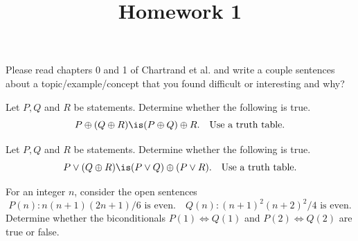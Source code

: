 \documentclass{homework}
\title{Homework 1}
\begin{document}
 \maketitle

\question Please read chapters 0 and 1 of Chartrand et al. and write a couple sentences about a topic/example/concept that you found difficult or interesting and why?

\question\label{a} Let $P, Q$ and $R$ be statements. Determine whether the following is true.
\[
    P \oplus (Q \oplus R) \is (P \oplus Q) \oplus R. \quad \text{Use a truth table.}
\]

\question Let $P, Q$ and $R$ be statements. Determine whether the following is true.
\[
    P \vee (Q \oplus R) \is (P \vee Q) \oplus (P \vee R). \quad \text{Use a truth table.}
\]


\question For an integer $n$, consider the open sentences
\[
    P(n): n(n + 1)(2n + 1)/6\text{ is even.} \quad Q(n): (n + 1)^2 (n + 2)^2 /4\text{ is even.}
\]
Determine whether the biconditionals $P(1) \iff Q(1)$ and $P(2) \iff Q(2)$ are true or false.
\end{document}

